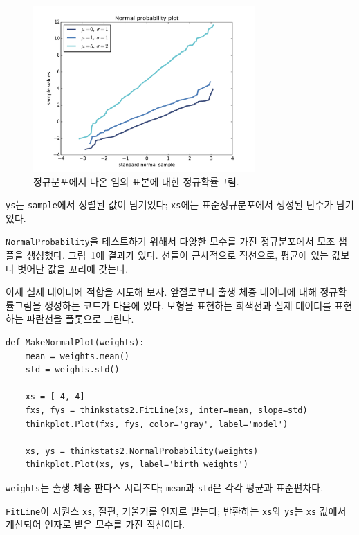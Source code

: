 \begin{figure}
\centerline{\includegraphics[height=2.5in]{figs/analytic_normal_prob_example.pdf}}
\caption{정규분포에서 나온 임의 표본에 대한 정규확률그림.}
\label{analytic_normal_prob_example}
\end{figure}

{\tt ys}는 {\tt sample}에서 정렬된 값이 담겨있다; 
{\tt xs}에는 표준정규분포에서 생성된 난수가 담겨있다.

{\tt NormalProbability}을 테스트하기 위해서 다양한 모수를 가진 
정규분포에서 모조 샘플을 생성했다.
그림~\ref{analytic_normal_prob_example}에 결과가 있다.
선들이 근사적으로 직선으로, 평균에 있는 값보다 벗어난 값을 꼬리에 갖는다.

이제 실제 데이터에 적합을 시도해 보자.
앞절로부터 출생 체중 데이터에 대해 정규확률그림을 생성하는 코드가 다음에 있다.
모형을 표현하는 회색선과 실제 데이터를 표현하는 파란선을 플롯으로 그린다.


\begin{verbatim}
def MakeNormalPlot(weights):
    mean = weights.mean()
    std = weights.std()

    xs = [-4, 4]
    fxs, fys = thinkstats2.FitLine(xs, inter=mean, slope=std)
    thinkplot.Plot(fxs, fys, color='gray', label='model')

    xs, ys = thinkstats2.NormalProbability(weights)
    thinkplot.Plot(xs, ys, label='birth weights')
\end{verbatim}

{\tt weights}는 출생 체중 판다스 시리즈다; {\tt mean}과 {\tt std}은
각각 평균과 표준편차다.

{\tt FitLine}이 시퀀스 {\tt xs}, 절편, 기울기를 인자로 받는다;
반환하는 {\tt xs}와 {\tt ys}는 {\tt xs} 값에서 계산되어 인자로 받은 모수를 가진 직선이다.

